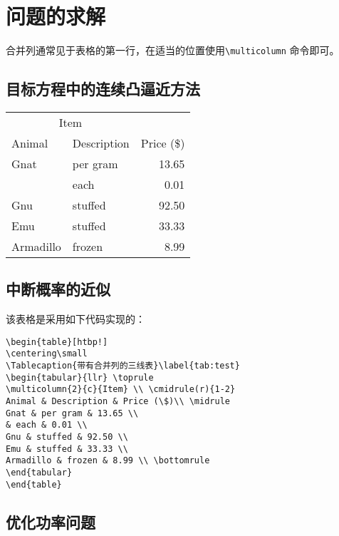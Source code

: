 \section{问题的求解}\label{section3-3}
合并列通常见于表格的第一行，在适当的位置使用\verb|\multicolumn| 命令即可。
\subsection{目标方程中的连续凸逼近方法}\label{section3-3-1}
\begin{table}[htbp!]
\centering\small
{}\label{tab:test}
\begin{tabular}{llr} \toprule
\multicolumn{2}{c}{Item} \\ \cmidrule(r){1-2}
Animal & Description & Price (\$)\\ \midrule
Gnat & per gram & 13.65 \\
& each & 0.01 \\
Gnu & stuffed & 92.50 \\
Emu & stuffed & 33.33 \\
Armadillo & frozen & 8.99 \\ \bottomrule
\end{tabular}
\end{table}

\subsection{中断概率的近似}\label{section3-3-2}
该表格是采用如下代码实现的：
\begin{verbatim}
\begin{table}[htbp!]
\centering\small
\Tablecaption{带有合并列的三线表}\label{tab:test}
\begin{tabular}{llr} \toprule
\multicolumn{2}{c}{Item} \\ \cmidrule(r){1-2}
Animal & Description & Price (\$)\\ \midrule
Gnat & per gram & 13.65 \\
& each & 0.01 \\
Gnu & stuffed & 92.50 \\
Emu & stuffed & 33.33 \\
Armadillo & frozen & 8.99 \\ \bottomrule
\end{tabular}
\end{table}
\end{verbatim}
\subsection{优化功率问题}\label{section3-3-3}

